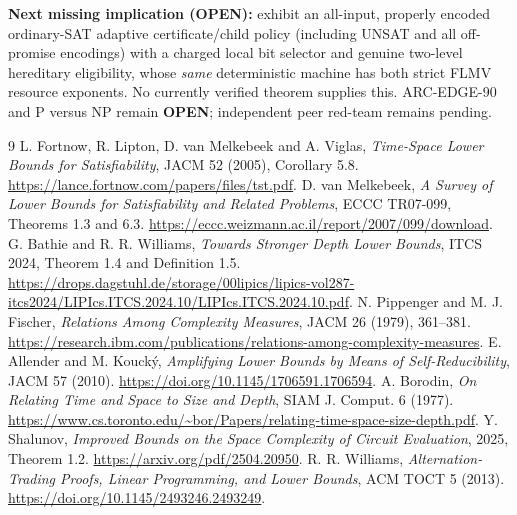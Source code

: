 \documentclass[11pt]{article}
\begin{document}
\textbf{Next missing implication (OPEN):} exhibit an all-input, properly encoded ordinary-SAT adaptive certificate/child policy (including UNSAT and all off-promise encodings) with a charged local bit selector and genuine two-level hereditary eligibility, whose \emph{same} deterministic machine has both strict FLMV resource exponents. No currently verified theorem supplies this. ARC-EDGE-90 and P versus NP remain \textbf{OPEN}; independent peer red-team remains pending.

\begin{thebibliography}{9}
 L. Fortnow, R. Lipton, D. van Melkebeek and A. Viglas, \emph{Time-Space Lower Bounds for Satisfiability}, JACM 52 (2005), Corollary 5.8. \url{https://lance.fortnow.com/papers/files/tst.pdf}.
 D. van Melkebeek, \emph{A Survey of Lower Bounds for Satisfiability and Related Problems}, ECCC TR07-099, Theorems 1.3 and 6.3. \url{https://eccc.weizmann.ac.il/report/2007/099/download}.
 G. Bathie and R. R. Williams, \emph{Towards Stronger Depth Lower Bounds}, ITCS 2024, Theorem 1.4 and Definition 1.5. \url{https://drops.dagstuhl.de/storage/00lipics/lipics-vol287-itcs2024/LIPIcs.ITCS.2024.10/LIPIcs.ITCS.2024.10.pdf}.
 N. Pippenger and M. J. Fischer, \emph{Relations Among Complexity Measures}, JACM 26 (1979), 361--381. \url{https://research.ibm.com/publications/relations-among-complexity-measures}.
 E. Allender and M. Kouck\'y, \emph{Amplifying Lower Bounds by Means of Self-Reducibility}, JACM 57 (2010). \url{https://doi.org/10.1145/1706591.1706594}.
 A. Borodin, \emph{On Relating Time and Space to Size and Depth}, SIAM J. Comput. 6 (1977). \url{https://www.cs.toronto.edu/~bor/Papers/relating-time-space-size-depth.pdf}.
 Y. Shalunov, \emph{Improved Bounds on the Space Complexity of Circuit Evaluation}, 2025, Theorem 1.2. \url{https://arxiv.org/pdf/2504.20950}.
 R. R. Williams, \emph{Alternation-Trading Proofs, Linear Programming, and Lower Bounds}, ACM TOCT 5 (2013). \url{https://doi.org/10.1145/2493246.2493249}.
\end{thebibliography}
\end{document}

